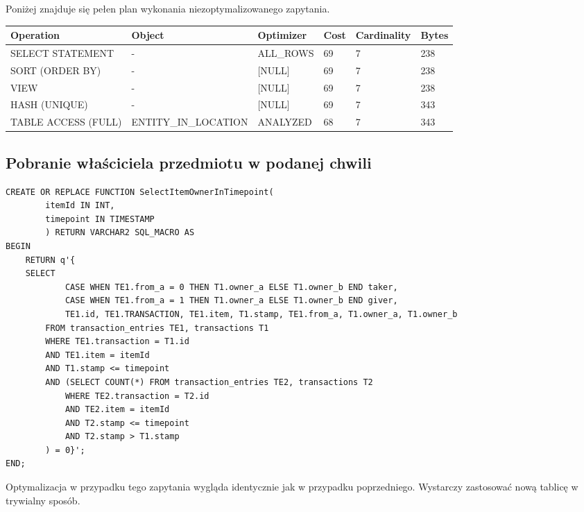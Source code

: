 \documentclass[11pt]{article}
\numberwithin{figure}{subsection}
\begin{document}
		Poniżej znajduje się pełen plan wykonania niezoptymalizowanego
		zapytania.
		\\
		
		\begin{tabularx}{\textwidth}{|X|X|X|X|X|X|}
Operation&Object&Optimizer&Cost&Cardinality&Bytes\\\hline
SELECT STATEMENT& - &ALL\_ROWS&69&7&238\\\hline
SORT (ORDER BY)& - &[NULL]&69&7&238\\\hline
VIEW& - &[NULL]&69&7&238\\\hline
HASH (UNIQUE)& - &[NULL]&69&7&343\\\hline
TABLE ACCESS (FULL)&ENTITY\_IN\_LOCATION&ANALYZED&68&7&343\\\hline
		\end{tabularx}
		
		
		
		
		
		
		
		
		
		
		
		
		
		
		
	
	\subsection{Pobranie właściciela przedmiotu w podanej chwili}
			
		\begin{lstlisting}[caption={Wersja niezoptymalizowana},captionpos=b]
CREATE OR REPLACE FUNCTION SelectItemOwnerInTimepoint(
		itemId IN INT,
		timepoint IN TIMESTAMP
		) RETURN VARCHAR2 SQL_MACRO AS
BEGIN
	RETURN q'{
	SELECT
			CASE WHEN TE1.from_a = 0 THEN T1.owner_a ELSE T1.owner_b END taker,
			CASE WHEN TE1.from_a = 1 THEN T1.owner_a ELSE T1.owner_b END giver,
			TE1.id, TE1.TRANSACTION, TE1.item, T1.stamp, TE1.from_a, T1.owner_a, T1.owner_b
		FROM transaction_entries TE1, transactions T1
		WHERE TE1.transaction = T1.id
		AND TE1.item = itemId
		AND T1.stamp <= timepoint
		AND (SELECT COUNT(*) FROM transaction_entries TE2, transactions T2
			WHERE TE2.transaction = T2.id
			AND TE2.item = itemId
			AND T2.stamp <= timepoint
			AND T2.stamp > T1.stamp
		) = 0}';
END;
		\end{lstlisting}
		
		Optymalizacja w przypadku tego zapytania wygląda identycznie jak w
		przypadku poprzedniego. Wystarczy zastosować nową tablicę w trywialny
		sposób.
		\\
			
\end{document}
